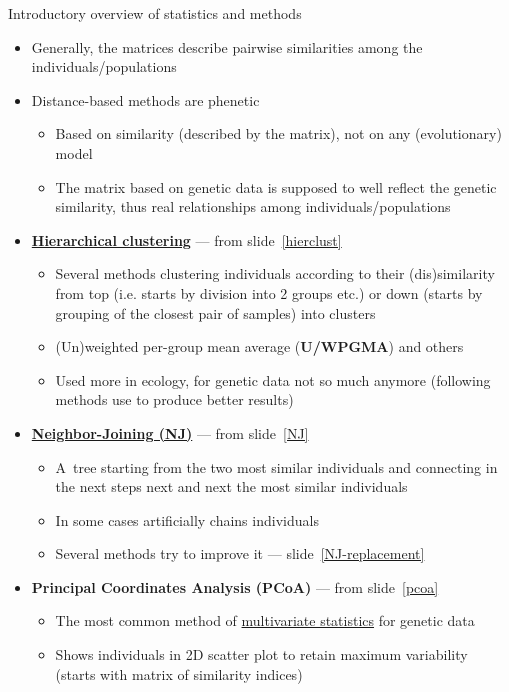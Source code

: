 \documentclass[compress, xelatex, 11pt, xcolor=svgnames, aspectratio=169, url={hyphens, lowtilde}]{beamer}
\begin{document}
\begin{frame}[allowframebreaks]{Introductory overview of statistics and methods}
\begin{itemize}
\begin{itemize}
			\item Generally, the matrices describe pairwise similarities among the individuals/populations
			\item Distance-based methods are phenetic
			\begin{itemize}
				\item Based on similarity (described by the matrix), not on any (evolutionary) model
				\item The matrix based on genetic data is supposed to well reflect the genetic similarity, thus real relationships among individuals/populations
			\end{itemize}
			\item \textbf{\href{https://en.wikipedia.org/wiki/Hierarchical_clustering}{Hierarchical clustering}} --- from slide~\ref{hierclust}
			\begin{itemize}
				\item Several methods clustering individuals according to their (dis)similarity from top (i.e. starts by division into 2 groups etc.) or down (starts by grouping of the closest pair of samples) into clusters
				\item (Un)weighted per-group mean average (\textbf{U/WPGMA}) and others
				\item Used more in ecology, for genetic data not so much anymore (following methods use to produce better results)
			\end{itemize}
			\item \textbf{\href{https://en.wikipedia.org/wiki/Neighbor_joining}{Neighbor-Joining (NJ)}} --- from slide~\ref{NJ}
			\begin{itemize}
				\item A~tree starting from the two most similar individuals and connecting in the next steps next and next the most similar individuals
				\item In some cases artificially chains individuals
				\item Several methods try to improve it --- slide~\ref{NJ-replacement}
			\end{itemize}
			\item \textbf{Principal Coordinates Analysis (PCoA)} --- from slide~\ref{pcoa}
			\begin{itemize}
				\item The most common method of \href{https://en.wikipedia.org/wiki/Multidimensional_scaling}{multivariate statistics} for genetic data
				\item Shows individuals in 2D scatter plot to retain maximum variability (starts with matrix of similarity indices)

\end{itemize}
\end{itemize}
\end{itemize}
\end{frame}
\end{document}
